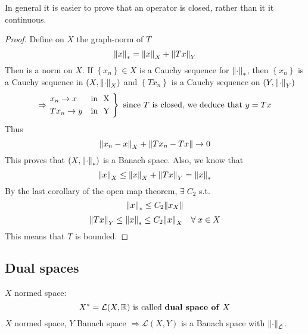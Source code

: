 \begin{remark}
    In general it is easier to prove that an operator is closed, rather than it it continuous.
\end{remark}
\begin{proof}
    Define on \(X\) the graph-norm of \(T\)
    \[
        \norm{x}_* = \norm{x}_X + \norm{Tx}_Y
    \]
    Then is a norm on \(X\). If \(\left\{ x_n \right\} \in X\) is a Cauchy sequence for \(\norm{\cdot}_*\), then \(\left\{ x_n \right\}\) is a Cauchy sequence in \((X, \norm{\cdot}_X)\) and \(\left\{ Tx_n \right\}\) is a Cauchy sequence on \((Y, \norm{\cdot}_Y)\)
    \[
        \Rightarrow \begin{rcases*}
            x_n \to x & \mbox{in } X \\
            Tx_n \to y & \mbox{in } Y
        \end{rcases*} \mbox{ since } T \mbox{ is closed, we deduce that } y = Tx
    \]
    Thus 
    \[
        \norm{x_n - x}_X + \norm{Tx_n - Tx} \to 0
    \]
    This proves that \((X, \norm{\cdot}_*)\) is a Banach space. Also, we know that 
    \[
        \norm{x}_X \leq \norm{x}_X + \norm{Tx}_Y = \norm{x}_*
    \]
    By the last corollary of the open map theorem, \(\exists \; C_2\) s.t. 
    \[
        \norm{x}_* \leq C_2 \norm{x_X}
    \]
    \[
        \norm{Tx}_Y \leq \norm{x}_* \leq C_2 \norm{x}_X \quad \forall \; x \in X
    \]
    This means that \(T\) is bounded.
\end{proof}
\subsection*{Dual spaces}
\(X\) normed space: 
\[
    X^* = \mathcal{L}(X, \mathbb{R}) \mbox{ is called \textbf{dual space of} }X
\]
\(X\) normed space, \(Y\) Banach space \(\Rightarrow \mathcal{L}(X, Y)\) is a Banach space with \(\norm{\cdot}_{\mathcal{L}}\).

